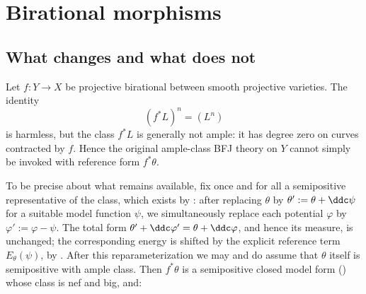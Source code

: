 \section{Birational morphisms}
\label{sec:ch30-birational}

\subsection{What changes and what does not}
\label{sec:ch30-birational-setting}

Let \(f:Y\to X\) be projective birational between smooth projective
varieties.  The identity
\begin{equation}
\label{eq:birational-top-intersection}
                         (f^*L)^n=(L^n)
\end{equation}
is harmless, but the class \(f^*L\) is generally not ample: it has degree
zero on curves contracted by \(f\).  Hence the original ample-class BFJ
theory on \(Y\) cannot simply be invoked with reference form \(f^*\theta\).

To be precise about what remains available, fix once and for all a
semipositive representative of the class, which exists by
: after replacing \(\theta\) by
\(\theta':=\theta+\ddc\psi\) for a suitable model function \(\psi\), we
simultaneously replace each potential \(\varphi\) by
\(\varphi':=\varphi-\psi\).  The total form
\(\theta'+\ddc\varphi'=\theta+\ddc\varphi\), and hence its measure, is
unchanged; the corresponding energy is shifted by the explicit reference
term \(E_\theta(\psi)\), by
.  After this
reparameterization we may and do assume that \(\theta\) itself is
semipositive with ample class.  Then
\(f^*\theta\) is a semipositive closed model form
() whose class is nef and big, and:

